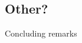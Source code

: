 \documentclass[twocolumn]{aastex631}
\begin{document}
\subsection{Other?}
Concluding remarks




{}

\end{document}
